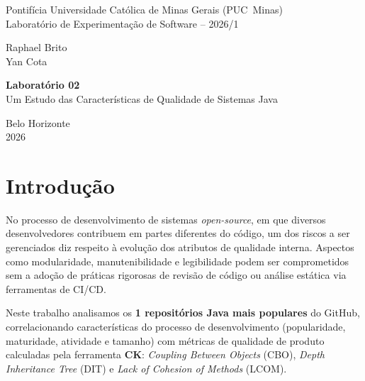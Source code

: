 \documentclass[10pt,a4paper,twocolumn]{article}
\begin{document}
\onecolumn

\begin{titlepage}
  \centering
  \vspace*{2.0cm}

  {\normalsize
    Pontifícia Universidade Católica de Minas Gerais (PUC~Minas)\\
    Laboratório de Experimentação de Software -- 2026/1
  }

  \vspace*{2.8cm}

  {\large
    Raphael Brito\\[0.3em]
    Yan Cota
  }

  \vspace*{4.2cm}

  {\LARGE \textbf{Laboratório 02}\\[0.5em]
  \Large Um Estudo das Características de Qualidade de Sistemas Java}

  \vfill

  {\normalsize Belo Horizonte\\ 2026}
\end{titlepage}

\tableofcontents
\newpage
{}
\setcounter{page}{1}
\twocolumn

\section{Introdução}

No processo de desenvolvimento de sistemas \textit{open-source}, em que
diversos desenvolvedores contribuem em partes diferentes do código, um dos
riscos a ser gerenciados diz respeito à evolução dos atributos de qualidade
interna. Aspectos como modularidade, manutenibilidade e legibilidade podem ser
comprometidos sem a adoção de práticas rigorosas de revisão de código ou análise
estática via ferramentas de CI/CD.

Neste trabalho analisamos os \textbf{1 repositórios Java mais populares}
do GitHub, correlacionando características do processo de desenvolvimento
(popularidade, maturidade, atividade e tamanho) com métricas de qualidade de
produto calculadas pela ferramenta \textbf{CK}: \textit{Coupling Between
Objects} (CBO), \textit{Depth Inheritance Tree} (DIT) e \textit{Lack of
Cohesion of Methods} (LCOM).
\end{document}
